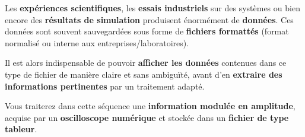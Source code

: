 Les \textbf{expériences scientifiques}, les \textbf{essais industriels} sur des systèmes ou bien encore des \textbf{résultats de simulation} produisent énormément de \textbf{données}. 
Ces données sont souvent sauvegardées sous forme de \textbf{fichiers formattés} (format normalisé ou interne aux entreprises/laboratoires).

Il est alors indispensable de pouvoir \textbf{afficher les données} contenues dans ce type de fichier de manière claire et sans ambiguïté, avant d'en \textbf{extraire des informations pertinentes} par un traitement adapté.

\medskip

Vous traiterez dans cette séquence une \textbf{information modulée en amplitude}, acquise par un \textbf{oscilloscope numérique} et stockée dans un \textbf{fichier de type tableur}.